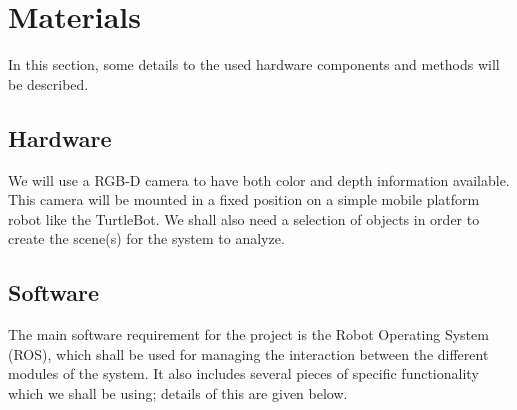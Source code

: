 \documentclass[a4paper,11pt,english]{article}
\begin{document}
\section{Materials}\label{materials}
In this section, some details to the used hardware components and methods will be described.
\subsection{Hardware}
We will use a RGB-D camera to have both color and depth information available.
This camera will be mounted in a fixed position on a simple mobile platform robot like the TurtleBot.
We shall also need a selection of objects in order to create the scene(s) for the system to analyze.

\subsection{Software}

The main software requirement for the project is the Robot Operating System (ROS), which shall be used for managing the interaction between the different modules of the system.
It also includes several pieces of specific functionality which we shall be using; details of this are given below.
\end{document}
